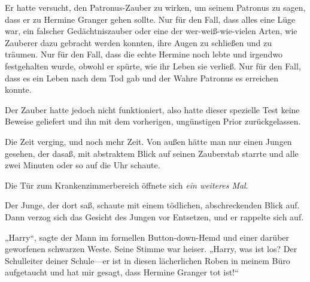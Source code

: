 Er hatte versucht, den Patronus-Zauber zu wirken, um seinem Patronus zu sagen, dass er zu Hermine Granger gehen sollte. Nur für den Fall, dass alles eine Lüge war, ein falscher Gedächtniszauber oder eine der wer-weiß-wie-vielen Arten, wie Zauberer dazu gebracht werden konnten, ihre Augen zu schließen und zu träumen. Nur für den Fall, dass die echte Hermine noch lebte und irgendwo festgehalten wurde, obwohl er spürte, wie ihr Leben sie verließ. Nur für den Fall, dass es ein Leben nach dem Tod gab und der Wahre Patronus es erreichen konnte.

Der Zauber hatte jedoch nicht funktioniert, also hatte dieser spezielle Test keine Beweise geliefert und ihn mit dem vorherigen, ungünstigen Prior zurückgelassen.

Die Zeit verging, und noch mehr Zeit. Von außen hätte man nur einen Jungen gesehen, der dasaß, mit abstraktem Blick auf seinen Zauberstab starrte und alle zwei Minuten oder so auf die Uhr schaute.

Die Tür zum Krankenzimmerbereich öffnete sich \emph{ein weiteres Mal}.


Der Junge, der dort saß, schaute mit einem tödlichen, abschreckenden Blick auf. Dann verzog sich das Gesicht des Jungen vor Entsetzen, und er rappelte sich auf.

„Harry“, sagte der Mann im formellen Button-down-Hemd und einer darüber geworfenen schwarzen Weste. Seine Stimme war heiser. „Harry, was ist los? Der Schulleiter deiner Schule—er ist in diesen lächerlichen Roben in meinem Büro aufgetaucht und hat mir gesagt, dass Hermine Granger tot ist!“

